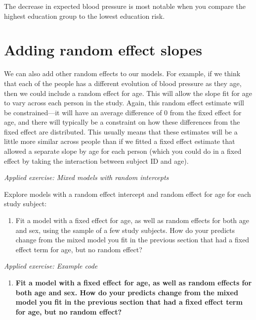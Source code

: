 \documentclass[
]{book}
\providecommand{\tightlist}{%
  \setlength{\itemsep}{0pt}\setlength{\parskip}{0pt}}
\begin{document}
The decrease in expected blood pressure is most notable when you compare the
highest education group to the lowest education risk.

\section{Adding random effect slopes}\label{adding-random-effect-slopes}

We can also add other random effects to our models. For example, if we think that
each of the people has a different evolution of blood pressure as they age, then
we could include a random effect for age. This will allow the slope fit for
age to vary across each person in the study. Again, this random effect estimate
will be constrained---it will have an average difference of 0 from the fixed
effect for age, and there will typically be a constraint on how these differences
from the fixed effect are distributed. This usually means that these estimates
will be a little more similar across people than if we fitted a fixed effect
estimate that allowed a separate slope by age for each person (which you could
do in a fixed effect by taking the interaction between subject ID and age).

\emph{Applied exercise: Mixed models with random intercepts}

Explore models with a random effect intercept and random effect for age for each study subject:

\begin{enumerate}
\def\labelenumi{\arabic{enumi}.}
\tightlist
\item
  Fit a model with a fixed effect for age, as well as random effects for both
  age and sex, using the sample of a few study subjects. How do your predicts
  change from the mixed model you fit in the previous section that had a fixed
  effect term for age, but no random effect?
\end{enumerate}

\emph{Applied exercise: Example code}

\begin{enumerate}
\def\labelenumi{\arabic{enumi}.}
\tightlist
\item
  \textbf{Fit a model with a fixed effect for age, as well as random effects for both
  age and sex. How do your predicts change from the mixed model you fit in the
  previous section that had a fixed effect term for age, but no random effect?}
\end{enumerate}
\end{document}
